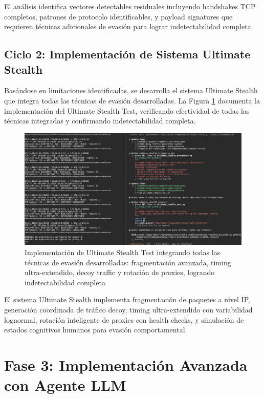 El análisis identifica vectores detectables residuales incluyendo handshakes TCP completos, patrones de protocolo identificables, y payload signatures que requieren técnicas adicionales de evasión para lograr indetectabilidad completa.

\subsection{Ciclo 2: Implementación de Sistema Ultimate Stealth}
\FloatBarrier

Basándose en limitaciones identificadas, se desarrolla el sistema Ultimate Stealth que integra todas las técnicas de evasión desarrolladas. La Figura \ref{fig:ultimate_stealth_test} documenta la implementación del Ultimate Stealth Test, verificando efectividad de todas las técnicas integradas y confirmando indetectabilidad completa.

\begin{figure}[!htbp]
\centering
\includegraphics[width=1\textwidth]{figures/scriptfuerzabrutanodetectable.png}
\caption{Implementación de Ultimate Stealth Test integrando todas las técnicas de evasión desarrolladas: fragmentación avanzada, timing ultra-extendido, decoy traffic y rotación de proxies, logrando indetectabilidad completa}
\label{fig:ultimate_stealth_test}
\end{figure}

El sistema Ultimate Stealth implementa fragmentación de paquetes a nivel IP, generación coordinada de tráfico decoy, timing ultra-extendido con variabilidad lognormal, rotación inteligente de proxies con health checks, y simulación de estados cognitivos humanos para evasión comportamental.

\section{Fase 3: Implementación Avanzada con Agente LLM}
\FloatBarrier

